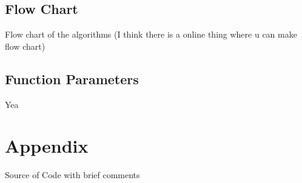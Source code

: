\documentclass[11pt]{article}
\begin{document}
\subsection{Flow Chart}

Flow chart of the algorithms (I think there is a online thing where u can make flow chart)

\subsection{Function Parameters}

Yea

\newpage














\section{Appendix}

Source of Code with brief comments
\end{document}
